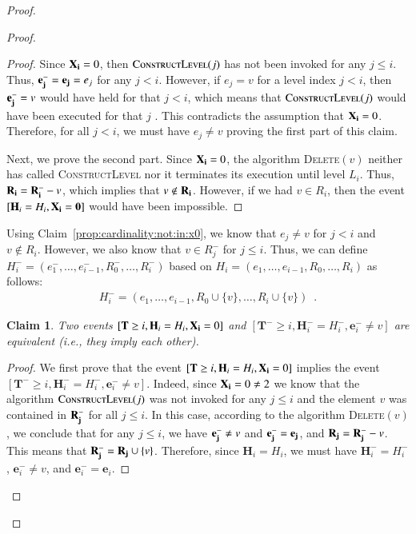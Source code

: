 \documentclass[11pt]{article}
\newtheorem{claim}{Claim}[section]
\newcommand{\constLevel}{\textsc{ConstructLevel}}
\newcommand{\deletev}{{\textsc{Delete}}}
\newcommand{\bE}{\ensuremath{\mathbf{e}}}
\newcommand{\bT}{\ensuremath{\mathbf{T}}}
\newcommand{\bH}{\ensuremath{\mathbf{H}}}
\begin{document}
\begin{proof}
\begin{proof}
\begin{proof}


Since $\bold{X_i}=0$, then $\constLevel{}(j)$ has not been invoked for any $j \le i$. 
Thus, $\bold{e_j^-} = \bold{e_j} = e_j$ for any $j < i$. 
However, if $e_j = v$ for a level index $j < i$, then $\bold{e_j^-} = v$ would have held for that $j < i$, 
which means that $\constLevel{}(j)$ would have been executed for that $j$ . 
This contradicts the assumption that $\bold{X_i}=0$. 
Therefore, for all $j < i$, we must have  $e_j \ne v$ proving the first part of this claim.  

Next, we prove the second part. 
Since $\bold{X_i} = 0$, the algorithm \deletev$(v)$ neither has called \constLevel{} nor it terminates its execution until level $L_i$. 
Thus, $\bold{R_i} = \bold{R_i^-} - v$, which implies that $v \notin \bold{R_i}$. 
However, if we had $v \in R_i$, then the event $[\bH_i = H_i, \bold{X_i = 0}]$ would have been impossible.
\end{proof}


Using Claim~\ref{prop:cardinality:not:in:x0}, 
we know that $e_j \ne v$ for $j < i$ and $v \notin R_i$. 
However, we also know that $v \in R_j^-$ for $j \le i$. 
Thus, we can define $H_i^- = (e_1^-, \dots, e_{i-1}^-, R_0^-  , \dots, R_i^- )$ 
based on $H_i = (e_1, \dots, e_{i-1}, R_0  , \dots, R_i)$ as follows:
\begin{align*}
    H_i^- =     (e_1, \dots, e_{i-1}, R_0 \cup \{v\} , \dots, R_i \cup \{v\}) \enspace. 
\end{align*}




\begin{claim}
    \label{pro:cardinality:events:eqn}
   Two events $[\bT \geq i, \bH_i = H_i, \bold{X_i} = 0]$ and $[\bT^- \geq i, \bH_i^- = H_i^-, \bE_i^- \neq v]$ are equivalent (i.e., they imply each other).
\end{claim}

\begin{proof}
We first prove that the event $[\bT \geq i, \bH_i = H_i, \bold{X_i} = 0]$ 
implies the event $[\bT^- \geq i, \bH_i^- = H_i^-,\bE_i^- \neq v]$. 
Indeed, since $\bold{X_i}=0 \ne 2$ we know that  
the algorithm $\constLevel{}(j)$ was not invoked for any $j \le i$ and 
the element $v$ was contained in $\bold{R_j^-}$ for all $j \le i$. 
In this case, according to the algorithm \deletev$(v)$, 
we conclude that for any $j \le i$, we have $\bold{e_j^-} \ne v $ and  $\bold{e_j^-} = \bold{e_j}$, and $\bold{R_j} = \bold{R_j^-} - v$.
This means that $\bold{R_j^-} = \bold{R_j} \cup \{v\}$. 
Therefore, since $\bH_i = H_i$, 
we must have  $\bH_i^- = H_i^-$, $\bE_i^- \neq v$, and  $\bE_i^-=\bE_i$.


\end{proof}
\end{proof}
\end{proof}
\end{document}
